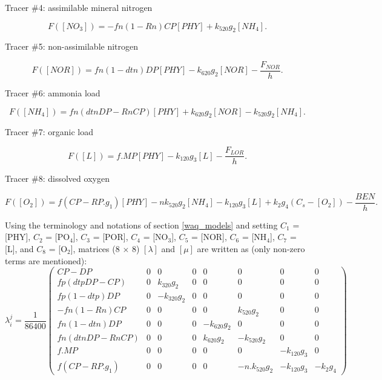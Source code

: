 Tracer $\#$4: assimilable mineral nitrogen

\begin{equation}
  F([NO_3]) = - fn (1- Rn) CP [PHY] + k_{520} g_2 [NH_4].
\end{equation}

Tracer $\#$5: non-assimilable nitrogen

\begin{equation}
  F([NOR]) = fn (1- dtn) DP [PHY] - k_{620} g_2 [NOR] - \frac{F_{NOR}}{h}.
\end{equation}

Tracer $\#$6: ammonia load

\begin{equation}
  F([NH_4]) = fn (dtn DP - Rn CP) [PHY] + k_{620} g_2 [NOR] - k_{520} g_2 [NH_4].
\end{equation}

Tracer $\#$7: organic load

\begin{equation}
  F([L]) = f.MP [PHY] - k_{120} g_3 [L] - \frac{F_{LOR}}{h}.
\end{equation}

Tracer $\#$8: dissolved oxygen

\begin{equation}
  F([O_2]) = f (CP - RP.g_1) [PHY] - n k_{520} g_2 [NH_4] - k_{120} g_3 [L] + k_2 g_4 (C_s - [O_2]) - \frac{BEN}{h}.
\end{equation}

Using the terminology and notations of section \ref{waq_models} and setting
$C_1$ = [PHY], $C_2$  = [PO$_4$], $C_3$ = [POR], $C_4$ = [NO$_3$], $C_5$ = [NOR],
$C_6$ = [NH$_4$], $C_7$ = [L], and $C_8$ = [O$_2$],
matrices (8 $\times$ 8) $[\lambda]$ and $[\mu]$
are written as (only non-zero terms are mentioned):\\

$$  \lambda_i^j = \frac{1}{86400}
  \begin{pmatrix}
    CP-DP               & 0 &            0 & 0 & 0 & 0 & 0 & 0 \\
    fp (dtp DP -CP)     & 0 &  k_{320} g_2  & 0 & 0 & 0 & 0 & 0 \\
    fp (1-dtp) DP       & 0 & -k_{320} g_2  & 0 & 0 & 0 & 0 & 0 \\
   -fn (1 -Rn) CP       & 0 &        0 & 0 & 0 &  k_{520} g_2 & 0 & 0 \\
    fn (1-dtn) DP       & 0 &        0 & 0 & -k_{620} g_2 & 0 & 0 & 0 \\
    fn (dtn DP - Rn CP) & 0 &        0 & 0 &  k_{620} g_2 & -k_{520} g_2 & 0 & 0 \\
    f . MP              & 0 &        0 & 0 & 0 & 0 & -k_{120} g_3 & 0 \\
    f (CP - RP .  g_1 ) & 0 &        0 & 0 & 0 & -n.k_{520} g_2 & -k_{120} g_3 & - k_2 g_4
  \end{pmatrix}
$$

